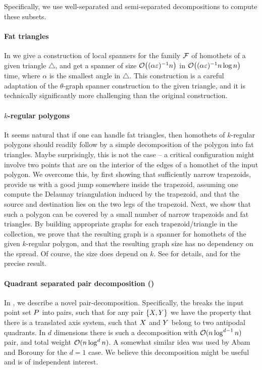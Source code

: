 \documentclass[12pt]{article}%
\begin{document}
Specifically, we use well-separated and semi-separated decompositions
to compute these subsets.



\paragraph{Fat triangles}
In  we give a construction of local spanners for the
family $\mathcal{F}$ of homothets of a given triangle $\triangle$, and get a
spanner of size $\Of\pth{ (\alpha\eps)^{-1}n }$ in
$\Of\pth{(\alpha\eps)^{-1}n\log n}$ time, where $\alpha$ is the
smallest angle in $\triangle$. This construction is a careful
adaptation of the $\theta$-graph spanner construction to the given
triangle, and it is technically significantly more challenging than
the original construction.


\paragraph{$k$-regular polygons}

It seems natural that if one can handle fat triangles, then homothets
of $k$-regular polygons should readily follow by a simple
decomposition of the polygon into fat triangles. Maybe surprisingly,
this is not the case -- a critical configuration might involve two
points that are on the interior of the edges of a homothet of the
input polygon. We overcome this, by first showing that sufficiently
narrow trapezoids, provide us with a good jump somewhere inside the
trapezoid, assuming one compute the Delaunay triangulation induced by
the trapezoid, and that the source and destination lies on the two
legs of the trapezoid. Next, we show that such a polygon can be
covered by a small number of narrow trapezoids and fat triangles. By
building appropriate graphs for each trapezoid/triangle in the
collection, we prove that the resulting graph is a spanner for
homothets of the given $k$-regular polygon, and that the resulting
graph size has no dependency on the spread. Of course, the size does
depend on $k$.  See  for details, and 
for the precise result.



\paragraph{Quadrant separated pair decomposition (\QSPD)}

In , we describe a novel pair-decomposition.
Specifically, the \QSPD breaks the input point set $P$ into pairs,
such that for any pair $\{X, Y\}$ we have the property that there
is a translated axis system, such that $X$ and $Y$ belong to two
antipodal quadrants.  In $d$ dimensions there is such a decomposition
with $\mathcal{O}( n \log^{d-1} n)$ pair, and total weight
$\mathcal{O}( n \log^{d} n)$.  A somewhat similar idea was used by Abam and
Borouny \cite{ab-lgs-21} for the $d=1$ case. We believe this
decomposition might be useful and is of independent interest.
\end{document}
